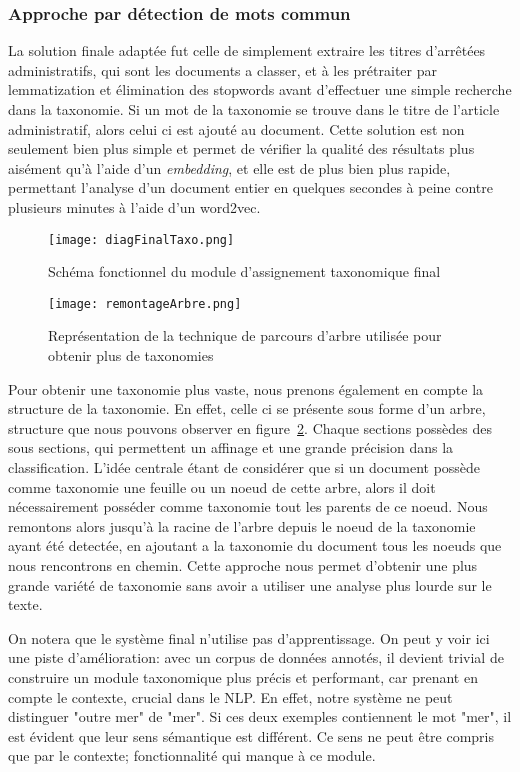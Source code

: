 \subsubsection{Approche par détection de mots commun}
La solution finale adaptée fut celle de simplement extraire les titres d'arrêtées administratifs, qui sont les documents a classer, et à les prétraiter par lemmatization et élimination des stopwords avant d'effectuer une simple recherche dans la taxonomie.
Si un mot de la taxonomie se trouve dans le titre de l'article administratif, alors celui ci est ajouté au document. Cette solution est non seulement bien plus simple et permet de vérifier la qualité des résultats plus aisément qu'à l'aide d'un \textit{embedding}, et elle est de plus bien plus rapide, permettant l'analyse d'un document entier en quelques secondes à peine contre plusieurs minutes à l'aide d'un word2vec.

\begin{figure}[h!]
  \centering
  \texttt{[image: diagFinalTaxo.png]}
	\caption[]{Schéma fonctionnel du module d'assignement taxonomique final}
  \label{taxoFinal}
\end{figure}

\begin{figure}[h!]
  \centering
  \texttt{[image: remontageArbre.png]}
	\caption[]{Représentation de la technique de parcours d'arbre utilisée pour obtenir plus de taxonomies}
  \label{fig:tree}
\end{figure}

Pour obtenir une taxonomie plus vaste, nous prenons également en compte la structure de la taxonomie. En effet, celle ci se présente sous forme d'un arbre, structure que nous pouvons observer en figure~\ref{fig:tree}. Chaque sections possèdes des sous sections, qui permettent un affinage et une grande précision dans la classification.
L'idée centrale étant de considérer que si un document possède comme taxonomie une feuille ou un noeud de cette arbre, alors il doit nécessairement posséder comme taxonomie tout les parents de ce noeud. Nous remontons alors jusqu'à la racine de l'arbre depuis le noeud de la taxonomie ayant été detectée, en ajoutant a la taxonomie du document tous les noeuds que nous rencontrons en chemin. Cette approche nous permet d'obtenir une plus grande variété de taxonomie sans avoir a utiliser une analyse plus lourde sur le texte. 

On notera que le système final n'utilise pas d'apprentissage.
On peut y voir ici une piste d'amélioration: avec un corpus de données annotés, il devient trivial de construire un module taxonomique plus précis et performant, car prenant en compte le contexte, crucial dans le NLP.
En effet, notre système ne peut distinguer "outre mer" de "mer". Si ces deux exemples contiennent le mot "mer", il est évident que leur sens sémantique est différent. Ce sens ne peut être compris que par le contexte; fonctionnalité qui manque à ce module. 


